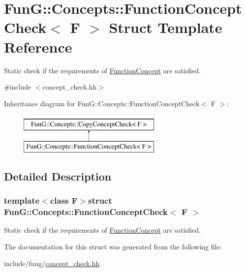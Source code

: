 \hypertarget{structFunG_1_1Concepts_1_1FunctionConceptCheck}{\section{Fun\-G\-:\-:Concepts\-:\-:Function\-Concept\-Check$<$ F $>$ Struct Template Reference}
\label{structFunG_1_1Concepts_1_1FunctionConceptCheck}
}


Static check if the requirements of \hyperlink{structFunG_1_1Concepts_1_1FunctionConcept}{Function\-Concept} are satisfied.  




{\ttfamily \#include $<$concept\-\_\-check.\-hh$>$}

Inheritance diagram for Fun\-G\-:\-:Concepts\-:\-:Function\-Concept\-Check$<$ F $>$\-:\begin{figure}[H]
\begin{center}
\leavevmode
\includegraphics[height=2.000000cm]{structFunG_1_1Concepts_1_1FunctionConceptCheck}
\end{center}
\end{figure}


\subsection{Detailed Description}
\subsubsection*{template$<$class F$>$struct Fun\-G\-::\-Concepts\-::\-Function\-Concept\-Check$<$ F $>$}

Static check if the requirements of \hyperlink{structFunG_1_1Concepts_1_1FunctionConcept}{Function\-Concept} are satisfied. 

The documentation for this struct was generated from the following file\-:\begin{DoxyCompactItemize}
\item 
include/fung/\hyperlink{concept__check_8hh}{concept\-\_\-check.\-hh}\end{DoxyCompactItemize}
